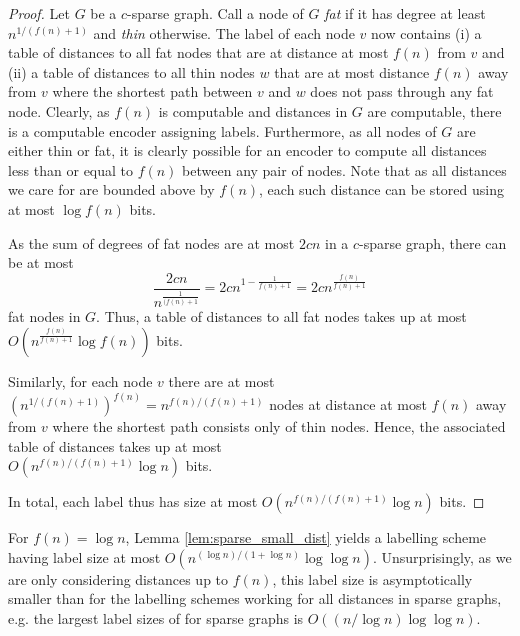 \begin{proof}
 Let $G$ be a $c$-sparse graph. Call a node of $G$ \emph{fat} if it has degree at least $n^{1/(f(n)+1)}$ and \emph{thin} otherwise.
The label of each node $v$ now contains (i) a table of distances to all fat nodes that are at distance at most $f(n)$ from $v$ and (ii) a table of distances to all thin nodes $w$ that are at most distance $f(n)$ away from $v$
where the shortest path between $v$ and $w$ does not pass through any fat node.
Clearly, as $f(n)$ is computable and distances in $G$ are computable, there is a computable encoder
assigning labels. Furthermore, as all nodes of $G$ are either thin or fat, it is clearly possible for an encoder to compute
all distances less than or equal to $f(n)$ between any pair of nodes. Note that as all distances we care for 
are bounded above by $f(n)$, each such distance can be stored using at most $\log f(n)$ bits.

As the sum of degrees of fat nodes are at most $2cn$ in a $c$-sparse graph, there can be at most
$$
\frac{2cn}{n^{\frac{1}{(f(n)+1}}} = 2cn^{1-\frac{1}{f(n)+1}} = 2cn^{\frac{f(n)}{f(n)+1}}
$$
fat nodes in $G$. Thus, a table of distances to all fat nodes takes up at most $O(n^{\frac{f(n)}{f(n)+1}} \log f(n))$ bits.

Similarly, for each node $v$ there are at most $(n^{1/(f(n)+1)})^{f(n)} = n^{f(n)/(f(n)+1)}$ nodes at distance at most $f(n)$ away from $v$ where the shortest path consists only of thin nodes.
 Hence, the associated table of distances takes up at most \\ $O(n^{f(n)/(f(n)+1)} \log n)$ bits.

In total, each label thus has size at most $O(n^{f(n)/(f(n)+1)} \log n)$ bits.
\end{proof}

For $f(n) = \log n$, Lemma \ref{lem:sparse_small_dist} yields a labelling scheme having label size
at most $O\left(n^{(\log n)/(1+ \log n)} \log\log n \right)$. Unsurprisingly, as we are only considering distances up
to $f(n)$, this label size is asymptotically smaller than for the labelling schemes working for all distances in sparse graphs, e.g. the largest label sizes of \cite{DBLP:journals/corr/GawrychowskiKU15} for sparse graphs is $O((n/\log n) \log\log n)$.
